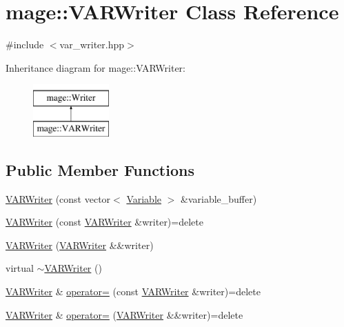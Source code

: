 \hypertarget{classmage_1_1_v_a_r_writer}{}\section{mage\+:\+:V\+A\+R\+Writer Class Reference}
\label{classmage_1_1_v_a_r_writer}


{\ttfamily \#include $<$var\+\_\+writer.\+hpp$>$}

Inheritance diagram for mage\+:\+:V\+A\+R\+Writer\+:\begin{figure}[H]
\begin{center}
\leavevmode
\includegraphics[height=2.000000cm]{classmage_1_1_v_a_r_writer}
\end{center}
\end{figure}
\subsection*{Public Member Functions}
\begin{DoxyCompactItemize}
\item 
\hyperlink{classmage_1_1_v_a_r_writer_a5ee1450f01948b70ab166e08f0969742}{V\+A\+R\+Writer} (const vector$<$ \hyperlink{structmage_1_1_variable}{Variable} $>$ \&variable\+\_\+buffer)
\item 
\hyperlink{classmage_1_1_v_a_r_writer_aa5534d333e4c5d65cb52a7b0691c65ab}{V\+A\+R\+Writer} (const \hyperlink{classmage_1_1_v_a_r_writer}{V\+A\+R\+Writer} \&writer)=delete
\item 
\hyperlink{classmage_1_1_v_a_r_writer_a6f9ef51a6c6c68b07de4a409a7ddeeda}{V\+A\+R\+Writer} (\hyperlink{classmage_1_1_v_a_r_writer}{V\+A\+R\+Writer} \&\&writer)
\item 
virtual \hyperlink{classmage_1_1_v_a_r_writer_ad59bc50f1a5fdb04f59784c5b0b0d676}{$\sim$\+V\+A\+R\+Writer} ()
\item 
\hyperlink{classmage_1_1_v_a_r_writer}{V\+A\+R\+Writer} \& \hyperlink{classmage_1_1_v_a_r_writer_aeb83b34d9768ca823a138abe3f9dea28}{operator=} (const \hyperlink{classmage_1_1_v_a_r_writer}{V\+A\+R\+Writer} \&writer)=delete
\item 
\hyperlink{classmage_1_1_v_a_r_writer}{V\+A\+R\+Writer} \& \hyperlink{classmage_1_1_v_a_r_writer_ad94891c5ead079afd9c2d33dcb3010e1}{operator=} (\hyperlink{classmage_1_1_v_a_r_writer}{V\+A\+R\+Writer} \&\&writer)=delete
\end{DoxyCompactItemize}
